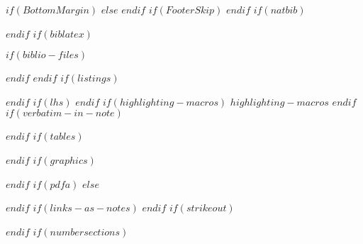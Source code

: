 \setlength{\defaultbottommargin}{1in}
$if(BottomMargin)$
\setlength{\defaultbottommargin}{$BottomMargin$}
$else$
\setlength{\defaultbottommargin}{1in}
$endif$
\setlength{\defaultheadheight}{\headheight}
$if(FooterSkip)$
\geometry{footskip=$FooterSkip$}
$endif$
$if(natbib)$
\usepackage{natbib}

$endif$
$if(biblatex)$
\usepackage{biblatex}
$if(biblio-files)$

$endif$
$endif$
$if(listings)$
\usepackage{listings}
$endif$
$if(lhs)$
$endif$
$if(highlighting-macros)$
$highlighting-macros$
$endif$
$if(verbatim-in-note)$
\usepackage{fancyvrb}
$endif$
$if(tables)$
\usepackage{longtable,booktabs}
$endif$
$if(graphics)$
\usepackage{graphicx}
\makeatletter
\makeatother
$endif$
$if(pdfa)$
$else$
\ifxetex
  \usepackage[setpagesize=false, unicode=false, xetex]{hyperref}
\else
  \usepackage[unicode=true]{hyperref}
\fi
$endif$
$if(links-as-notes)$
\renewcommand{\href}[2]{#2\footnote{\url{#1}}}
$endif$
$if(strikeout)$
\usepackage[normalem]{ulem}
\pdfstringdefDisableCommands{\renewcommand{\sout}{}}
$endif$
\setlength{\parindent}{0pt}
\setlength{\parskip}{6pt plus 2pt minus 1pt}
\setlength{\emergencystretch}{3em}  %
\providecommand{\tightlist}{%
\setlength{\itemsep}{0pt}\setlength{\parskip}{0pt}}
$if(numbersections)$
